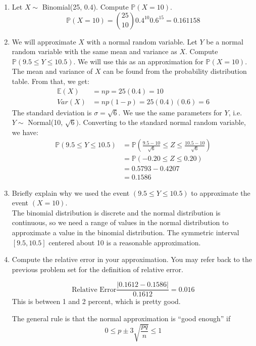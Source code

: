 \documentclass[12pt]{article}
\def\P{{\mathbb P}}
\def\E{{\mathbb E}}
\begin{document}
\begin{enumerate}
\begin{enumerate}
\item Let $X \sim$ Binomial(25, 0.4). Compute $\P(X = 10)$.\\

\[
\P(X = 10) = \binom{25}{10}0.4^{10}0.6^{15} = 0.161158
\]

\item We will approximate $X$ with a normal random variable. Let $Y$ be a normal random variable with the same mean and variance as $X$. Compute $\P(9.5 \leq Y \leq 10.5)$. We will use this as an approximation for $\P(X = 10)$.\\

The mean and variance of $X$ can be found from the probability distribution table. From that, we get:
\begin{align*}
\E(X) &= np = 25(0.4) = 10\\
Var(X) &= np(1-p) = 25(0.4)(0.6) = 6
\end{align*}
The standard deviation is $\sigma = \sqrt{6}$. We use the same parameters for $Y$, i.e. $Y \sim$ Normal(10, $\sqrt{6})$. Converting to the standard normal random variable, we have:
\begin{align*}
\P(9.5 \leq Y \leq 10.5) &= \P\left( \frac{9.5 - 10}{\sqrt{6}} \leq Z \leq \frac{10.5 - 10}{\sqrt{6}} \right) \\
&= \P\left( -0.20 \leq Z \leq 0.20 \right) \\
&= 0.5793 - 0.4207 \\
&= 0.1586
\end{align*}

\item Briefly explain why we used the event $(9.5 \leq Y \leq 10.5)$ to approximate the event $(X = 10)$.\\

The binomial distribution is discrete and the normal distribution is continuous, so we need a range of values in the normal distribution to approximate a value in the binomial distribution. The symmetric interval $[9.5, 10.5]$ centered about 10 is a reasonable approximation.

\item Compute the relative error in your approximation. You may refer back to the previous problem set for the definition of relative error.

\[
\text{Relative Error} \frac{| 0.1612 - 0.1586 |}{0.1612} = 0.016
\]
This is between 1 and 2 percent, which is pretty good.

The general rule is that the normal approximation is ``good enough'' if
\[
0 \leq p \pm 3 \sqrt{\frac{pq}{n}} \leq 1
\]


\end{enumerate}
\end{enumerate}
\end{document}

